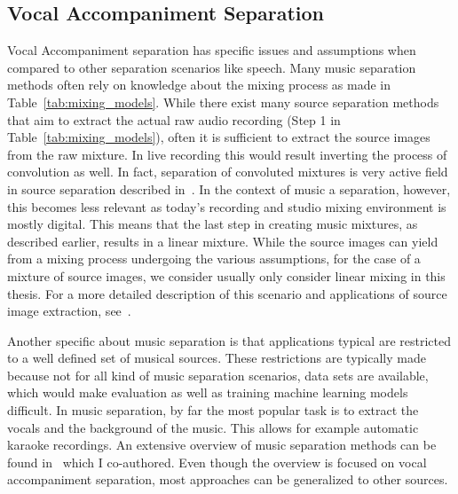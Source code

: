 \subsection{Vocal Accompaniment Separation}
Vocal Accompaniment separation has specific issues and assumptions when compared to other separation scenarios like speech.
Many music separation methods often rely on knowledge about the mixing process as made in Table~\ref{tab:mixing_models}.
While there exist many source separation methods that aim to extract the actual raw audio recording (Step 1 in  Table~\ref{tab:mixing_models}), often it is sufficient to extract the source images from the raw mixture.
In live recording this would result inverting the process of convolution as well.
In fact, separation of convoluted mixtures is very active field in source separation described in~\cite{pedersen07}.
In the context of music a separation, however, this becomes less relevant as today's recording and studio mixing environment is mostly digital.
This means that the last step in creating music mixtures, as described earlier, results in a linear mixture.
While the source images can yield from a mixing process undergoing the various assumptions, for the case of a mixture of source images, we consider usually only consider linear mixing in this thesis.
For a more detailed description of this scenario and applications of source image extraction, see~\cite{sturmel12}.
\par
Another specific about music separation is that applications typical are restricted to a well defined set of musical sources.
These restrictions are typically made because not for all kind of music separation scenarios, data sets are available, which would make evaluation as well as training machine learning models difficult.
In music separation, by far the most popular task is to extract the vocals and the background of the music.
This allows for example automatic karaoke recordings.
An extensive overview of music separation methods can be found in~\cite{rafii18} which I co-authored.
Even though the overview is focused on vocal accompaniment separation, most approaches can be generalized to other sources.

